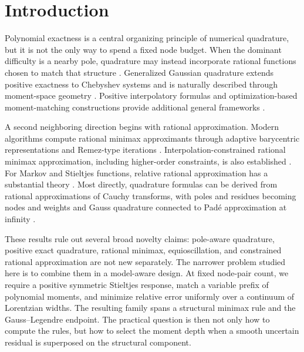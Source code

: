 \documentclass[preprint,12pt]{elsarticle}
\theoremstyle{remark}
\begin{document}
\section{Introduction}

Polynomial exactness is a central organizing principle of numerical
quadrature, but it is not the only way to spend a fixed node budget.
When the dominant difficulty is a nearby pole, quadrature may instead
incorporate rational functions chosen to match that structure
\cite{gautschi1993,gautschi2001}. Generalized Gaussian quadrature extends positive
exactness to Chebyshev systems and is naturally described through
moment-space geometry \cite{huybrechs2017}. Positive interpolatory
formulas and optimization-based moment-matching constructions provide
additional general frameworks \cite{vandebos2019,glaubitz2020,
keshavarzzadeh2018}.

A second neighboring direction begins with rational approximation.
Modern algorithms compute rational minimax approximants through adaptive
barycentric representations and Remez-type iterations
\cite{filip2018}. Interpolation-constrained rational minimax
approximation, including higher-order constraints, is also established
\cite{zhang2025}. For Markov and Stieltjes functions, relative rational
approximation has a substantial theory \cite{beckermann2021}. Most
directly, quadrature formulas can be derived from rational
approximations of Cauchy transforms, with poles and residues becoming
nodes and weights and Gauss quadrature connected to Pad\'e approximation
at infinity \cite{horning2025}.

These results rule out several broad novelty claims: pole-aware
quadrature, positive exact quadrature, rational minimax,
equioscillation, and constrained rational approximation are not new
separately. The narrower problem studied here is to combine them in a
model-aware design. At fixed node-pair count, we require a positive
symmetric Stieltjes response, match a variable prefix of polynomial
moments, and minimize relative error uniformly over a continuum of
Lorentzian widths. The resulting family spans a structural minimax rule
and the Gauss--Legendre endpoint. The practical question is then not
only how to compute the rules, but how to select the moment depth when a
smooth uncertain residual is superposed on the structural component.
\end{document}
